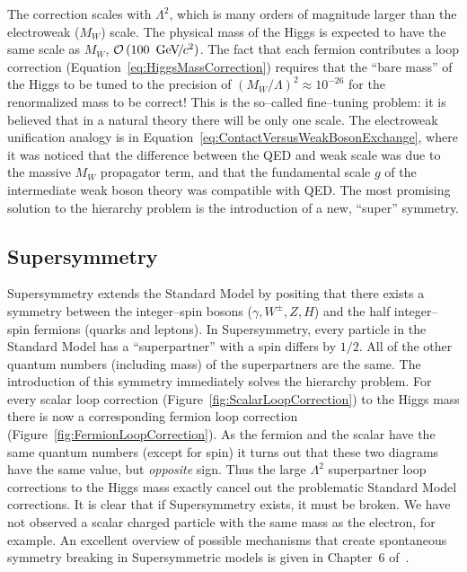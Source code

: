 The correction scales with $\Lambda^2$, which is many orders of magnitude larger
than the electroweak ($M_W$) scale.  The physical mass of the Higgs is expected
to have the same scale as $M_W$, $\mbox{\ensuremath{\mathcal{O}\left(100~{\,\text{Ge\hspace{-.08em}V\hspace{-0.16em}/\hspace{-0.08em}}c^\text{2}}\right)}}$.  The fact that each fermion
contributes a loop correction (Equation~\ref{eq:HiggsMassCorrection}) requires
that the ``bare mass'' of the Higgs to be tuned to the precision of
$(M_W/\Lambda)^2 \approx 10^{-26}$ for the renormalized mass to be correct!
This is the so--called fine--tuning problem: it is believed that in a natural
theory there will be only one scale.  The electroweak unification analogy is in
Equation~\ref{eq:ContactVersusWeakBosonExchange}, where it was noticed that the
difference between the QED and weak scale was due to the massive $M_W$
propagator term, and that the fundamental scale $g$ of the intermediate weak
boson theory was compatible with QED\@.  The most promising solution to the
hierarchy problem is the introduction of a new, ``super'' symmetry.

\subsection{Supersymmetry}
Supersymmetry extends the Standard Model by positing that there exists a
symmetry between the integer--spin bosons ($\gamma, W^\pm, Z, H$) and the half
integer--spin fermions (quarks and leptons).  In Supersymmetry, every particle
in the Standard Model has a ``superpartner'' with a spin differs by $1/2$.  All
of the other quantum numbers (including mass) of the superpartners are the same.
The introduction of this symmetry immediately solves the hierarchy problem.  For
every scalar loop correction (Figure~\ref{fig:ScalarLoopCorrection}) to the
Higgs mass there is now a corresponding fermion loop correction
(Figure~\ref{fig:FermionLoopCorrection}).  As the fermion and the scalar have
the same quantum numbers (except for spin) it turns out that these two diagrams
have the same value, but \emph{opposite} sign.  Thus the large $\Lambda^2$
superpartner loop corrections to the Higgs mass exactly cancel out the
problematic Standard Model corrections.  It is clear that if Supersymmetry
exists, it must be broken.  We have not observed a scalar charged particle with
the same mass as the electron, for example.  An excellent overview of possible
mechanisms that create spontaneous symmetry breaking in Supersymmetric models is
given in Chapter~6 of~\cite{Martin:1997um}.

